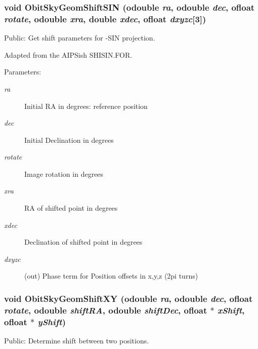 \subsubsection{\setlength{\rightskip}{0pt plus 5cm}void Obit\-Sky\-Geom\-Shift\-SIN ({\bf odouble} {\em ra}, {\bf odouble} {\em dec}, {\bf ofloat} {\em rotate}, {\bf odouble} {\em xra}, double {\em xdec}, {\bf ofloat} {\em dxyzc}[3])}\label{ObitSkyGeom_8c_a5}


Public: Get shift parameters for -SIN projection. 

Adapted from the AIPSish SHISIN.FOR. \begin{Desc}
\item[Parameters:]
\begin{description}
\item[{\em ra}]Initial RA in degrees: reference position \item[{\em dec}]Initial Declination in degrees \item[{\em rotate}]Image rotation in degrees \item[{\em xra}]RA of shifted point in degrees \item[{\em xdec}]Declination of shifted point in degrees \item[{\em dxyzc}](out) Phase term for Position offsets in x,y,z (2pi turns) \end{description}
\end{Desc}
\subsubsection{\setlength{\rightskip}{0pt plus 5cm}void Obit\-Sky\-Geom\-Shift\-XY ({\bf odouble} {\em ra}, {\bf odouble} {\em dec}, {\bf ofloat} {\em rotate}, {\bf odouble} {\em shift\-RA}, {\bf odouble} {\em shift\-Dec}, {\bf ofloat} $\ast$ {\em x\-Shift}, {\bf ofloat} $\ast$ {\em y\-Shift})}\label{ObitSkyGeom_8c_a3}


Public: Determine shift between two positions. 

